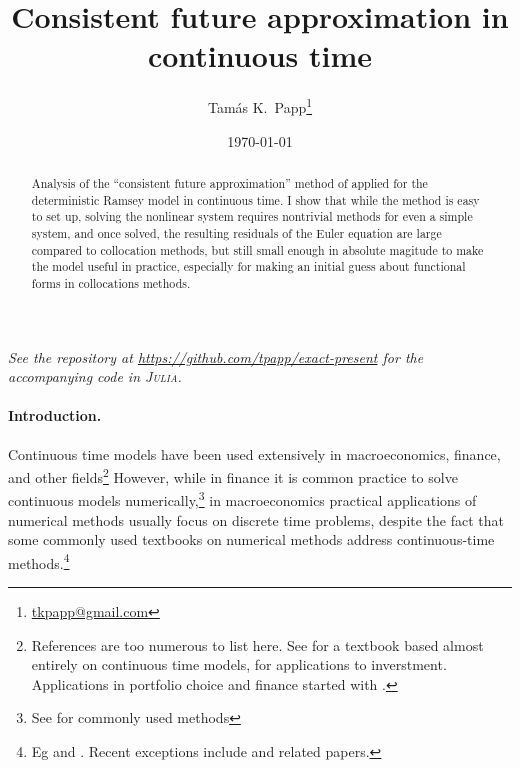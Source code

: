 \documentclass[a4paper,11pt]{article}
\begin{document}
\title{Consistent future approximation in continuous time}
\author{Tam\'as K.~Papp\thanks{\url{tkpapp@gmail.com}}}
\date{\today}
\maketitle

\begin{abstract}
  Analysis of the ``consistent future approximation'' method of \textcite{den2015exact} applied for the deterministic Ramsey model in continuous time. I show that while the method is easy to set up, solving the nonlinear system requires nontrivial methods for even a simple system, and once solved, the resulting residuals of the Euler equation are large compared to collocation methods, but still small enough in absolute magitude to make the model useful in practice, especially for making an initial guess about functional forms in collocations methods. 
\end{abstract}

\begin{center}
  \textsl{See the repository at \url{https://github.com/tpapp/exact-present} 
    for the accompanying code in \textsc{Julia}\nocite{bezanson17:_julia}.}
\end{center}

\paragraph{Introduction.}

Continuous time models have been used extensively in macroeconomics, finance, and other fields\footnote{References are too numerous to list here. See \textcite{acemoglu2008introduction} for a textbook based almost entirely on continuous time models, \textcite{dixit1996investment} for applications to inverstment. Applications in portfolio choice and finance started with \textcite{merton1971optimum}.} However, while in finance it is common practice to solve continuous models numerically,\footnote{See \textcite{hull2009options} for commonly used methods} in macroeconomics practical applications of numerical methods usually focus on discrete time problems, despite the fact that some commonly used textbooks on numerical methods address continuous-time methods.\footnote{Eg \textcite{judd98:_numer_method_in_econom} and \textcite{miranda02:_applied_comput_econom_and_finan}. Recent exceptions include \textcite{kaplan2016monetary} and related papers.}
\end{document}
